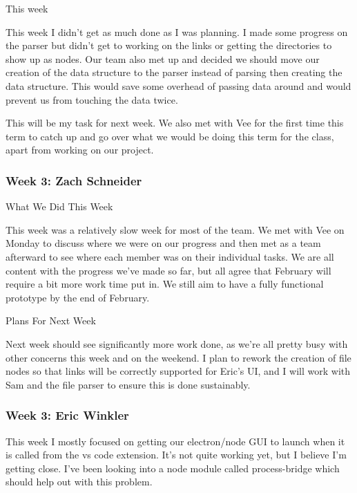 This week

This week I didn't get as much done as I was planning. I made some progress on the parser but didn't get to working on the links or getting the directories to show up as nodes. Our team also met up and decided we should move our creation of the data structure to the parser instead of parsing then creating the data structure. This would save some overhead of passing data around and would prevent us from touching the data twice.



This will be my task for next week. We also met with Vee for the first time this term to catch up and go over what we would be doing this term for the class, apart from working on our project. \\ 

 \subsubsection{Week 3: Zach Schneider}

What We Did This Week

This week was a relatively slow week for most of the team. We met with Vee on Monday to discuss where we were on our progress and then met as a team afterward to see where each member was on their individual tasks. We are all content with the progress we've made so far, but all agree that February will require a bit more work time put in. We still aim to have a fully functional prototype by the end of February.



Plans For Next Week

Next week should see significantly more work done, as we're all pretty busy with other concerns this week and on the weekend. I plan to rework the creation of file nodes so that links will be correctly supported for Eric's UI, and I will work with Sam and the file parser to ensure this is done sustainably. \\ 

 \subsubsection{Week 3: Eric Winkler}

This week I mostly focused on getting our electron/node GUI to launch when it is called from the vs code extension. It's not quite working yet, but I believe I'm getting close. I've been looking into a node module called process-bridge which should help out with this problem.




